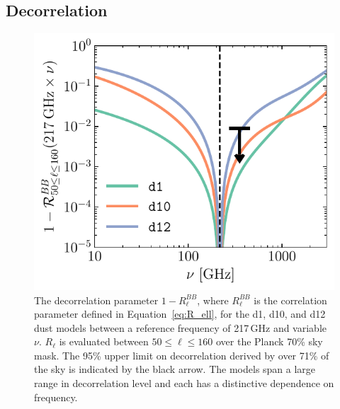 \documentclass[twocolumn]{aastex631}
\begin{document}

\subsection{Decorrelation} \label{subsec:decorrelation}

\begin{figure}
    \centering
    \includegraphics[width=\columnwidth]{figures/decorrelation_dust.pdf}
    \caption{The decorrelation parameter $1-R_\ell^{BB}$, where $R_\ell^{BB}$ is the correlation parameter defined in Equation~\eqref{eq:R_ell}, for the d1, d10, and d12 dust models between a reference frequency of 217\,GHz and variable $\nu$. $R_\ell$ is evaluated between $50 \leq \ell \leq 160$ over the Planck 70\% sky mask. The 95\% upper limit on decorrelation derived by \citet{planck2016-l11A} over 71\% of the sky is indicated by the black arrow. The models span a large range in decorrelation level and each has a distinctive dependence on frequency.}
    \label{fig:decorrelation}
\end{figure}
\end{document}
